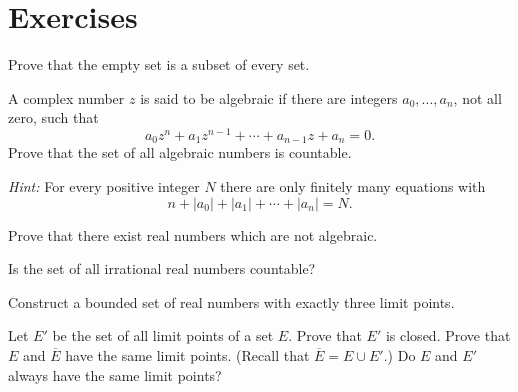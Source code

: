 
\section{Exercises}

\begin{myexercise}
    \label{ex:2.1}
    Prove that the empty set is a subset of every set.
\end{myexercise}

\begin{myexercise}
    \label{ex:2.2}
    A complex number $z$ is said to be algebraic 
    if there are integers $a_0, ... , a_n$, not all
    zero, such that
    \begin{equation*}
        a_{0} z^{n} 
        + a_{1} z^{n-1}
        +\cdots
        + a_{n-1} z
        + a_n = 0 .
    \end{equation*}
    Prove that the set of all algebraic numbers is countable. 
    
    \emph{Hint:} For every positive integer $N$ 
    there are only finitely many equations with
    \begin{equation*}
        n 
        + |a_0|
        + |a_1|
        + \cdots
        + |a_n| = N .
    \end{equation*}
\end{myexercise}

\begin{myexercise}
    \label{ex:2.3}
    Prove that there exist real numbers which are not algebraic.
\end{myexercise}

\begin{myexercise}
    \label{ex:2.4}
    Is the set of all irrational real numbers countable?
\end{myexercise}

\begin{myexercise}
    \label{ex:2.5}
    Construct a bounded set of real numbers with exactly three limit points.
\end{myexercise}

\begin{myexercise}
    \label{ex:2.6}
    Let $E'$ be the set of all limit points of a set $E$. 
    Prove that $E'$ is closed. 
    Prove that $E$ and $\overline{E}$ have the same limit points. 
    (Recall that $\overline{E} = E \cup E'$.) 
    Do $E$ and $E'$ always have the same limit points?
\end{myexercise}

